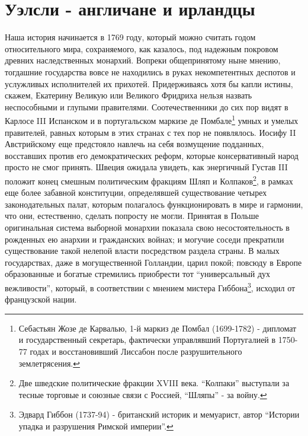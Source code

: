 \documentclass[
  oneside,
  12pt,
  titlepage]{book}
\begin{document}
\hypertarget{ux443ux44dux43bux441ux43bux438---ux430ux43dux433ux43bux438ux447ux430ux43dux435-ux438-ux438ux440ux43bux430ux43dux434ux446ux44b}{%
\chapter{Уэлсли - англичане и ирландцы}\label{ux443ux44dux43bux441ux43bux438---ux430ux43dux433ux43bux438ux447ux430ux43dux435-ux438-ux438ux440ux43bux430ux43dux434ux446ux44b}}

Наша история начинается в 1769 году, который можно считать годом относительного мира, сохраняемого, как казалось, под надежным покровом древних наследственных монархий. Вопреки общепринятому ныне мнению, тогдашние государства вовсе не находились в руках некомпетентных деспотов и услужливых исполнителей их прихотей. Придерживаясь хотя бы капли истины, скажем, Екатерину Великую или Великого Фридриха нельзя назвать неспособными и глупыми правителями. Соотечественники до сих пор видят в Карлосе III Испанском и в португальском маркизе де Помбале\footnote{Себастьян Жозе де Карвалью, 1-й маркиз де Помбал (1699-1782) - дипломат и государственный секретарь, фактически управлявший Португалией в 1750-77 годах и восстановивший Лиссабон после разрушительного землетрясения.} умных и умелых правителей, равных которым в этих странах с тех пор не появлялось. Иосифу II Австрийскому еще предстояло навлечь на себя возмущение подданных, восставших против его демократических реформ, которые консервативный народ просто не смог принять. Швеция ожидала увидеть, как энергичный Густав III положит конец смешным политическим фракциям Шляп и Колпаков\footnote{Две шведские политические фракции XVIII века. ``Колпаки'' выступали за тесные торговые и союзные связи с Россией, ``Шляпы'' - за войну.}, в рамках еще более забавной конституции, определявшей существование четырех законодательных палат, которым полагалось функционировать в мире и гармонии, что они, естественно, сделать попросту не могли. Принятая в Польше оригинальная система выборной монархии показала свою несостоятельность в рожденных ею анархии и гражданских войнах; и могучие соседи прекратили существование такой нелепой власти посредством раздела страны. В малых государствах, даже в могущественной Голландии, царил покой; повсюду в Европе образованные и богатые стремились приобрести тот ``универсальный дух вежливости'', который, в соответствии с мнением мистера Гиббона\footnote{Эдвард Гиббон (1737-94) - британский историк и мемуарист, автор ``Истории упадка и разрушения Римской империи''.}, исходил от французской нации.
\end{document}
